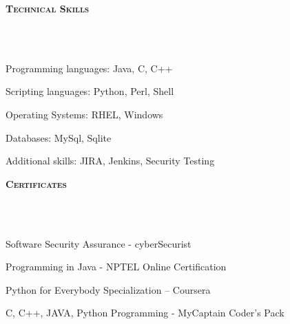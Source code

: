\documentclass{article}
\newcommand\blfootnote[1]{%
  \begingroup
  \renewcommand\thefootnote{}\footnote{#1}%
  \addtocounter{footnote}{-1}%
  \endgroup
}
\newcommand{\header}[1]{{
\hspace*{-15pt}\vspace*{6pt} \textsc{#1}} \vspace*{-6pt} 
\lineunder
}
\newcommand{\lineunder}{
\vspace*{-8pt} \\ \hspace*{-18pt} 
\hrulefill \\
}
\renewcommand{\labelitemii}{
$\vcenter{\hbox{\tiny$\bullet$}}$\hspace*{-3pt}
}
\newenvironment{bullet-list-major}{
\begin{list}{\labelitemii}{\setlength\leftmargin{3pt} 
\topsep 0pt \itemsep -2pt}}{\vspace*{4pt}\end{list}
}
\begin{document}
\vspace*{6pt}%
\header{\textbf{Technical Skills}}
    \begin{bullet-list-major}
    \item Programming languages: Java, C, C++
    \vspace{2pt}
    \item Scripting languages: Python, Perl, Shell
    \vspace{2pt}
    \item Operating Systems: RHEL, Windows
    \vspace{2pt}
    \item Databases: MySql, Sqlite
    \vspace{2pt}
    \item Additional skills: JIRA, Jenkins, Security Testing
    \end{bullet-list-major}

\vspace*{6pt}%
\header{\textbf{Certificates}}
    \begin{bullet-list-major}
    \item  Software Security Assurance - cyberSecurist
    \vspace{2pt}
    \item  Programming in Java - NPTEL Online Certification
    \vspace{2pt}
    \item  Python for Everybody Specialization – Coursera 
    \vspace{2pt}
    \item  C, C++, JAVA, Python Programming - MyCaptain Coder's Pack
    \vspace{2pt}
    \end{bullet-list-major}

\end{document}
